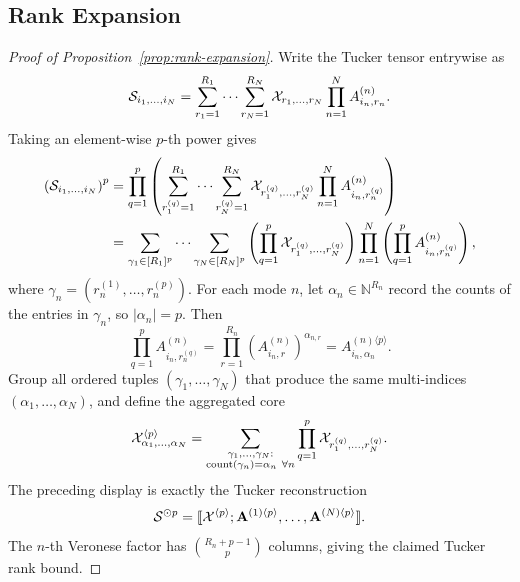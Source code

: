 \subsection{Rank Expansion}

\begin{proof}[Proof of Proposition~\ref{prop:rank-expansion}]
Write the Tucker tensor entrywise as
\begin{equation}
  \mathcal{S}_{i_1,\ldots,i_N}
  =
  \sum_{r_1=1}^{R_1}\cdots\sum_{r_N=1}^{R_N}
  \mathcal{X}_{r_1,\ldots,r_N}
  \prod_{n=1}^{N} A^{(n)}_{i_n,r_n}.
\end{equation}
Taking an element-wise \(p\)-th power gives
\begin{align}
  \left(\mathcal{S}_{i_1,\ldots,i_N}\right)^p
  &=
  \prod_{q=1}^{p}
  \left(
  \sum_{r_1^{(q)}=1}^{R_1}\cdots
  \sum_{r_N^{(q)}=1}^{R_N}
  \mathcal{X}_{r_1^{(q)},\ldots,r_N^{(q)}}
  \prod_{n=1}^{N} A^{(n)}_{i_n,r_n^{(q)}}
  \right) \\
  &=
  \sum_{\gamma_1\in[R_1]^p}\cdots
  \sum_{\gamma_N\in[R_N]^p}
  \left(
  \prod_{q=1}^{p}
  \mathcal{X}_{r_1^{(q)},\ldots,r_N^{(q)}}
  \right)
  \prod_{n=1}^{N}
  \left(
  \prod_{q=1}^{p} A^{(n)}_{i_n,r_n^{(q)}}
  \right),
\end{align}
where \(\gamma_n=(r_n^{(1)},\ldots,r_n^{(p)})\). For each mode \(n\), let
\(\alpha_n\in\mathbb N^{R_n}\) record the counts of the entries in
\(\gamma_n\), so \(|\alpha_n|=p\). Then
\begin{equation}
  \prod_{q=1}^{p} A^{(n)}_{i_n,r_n^{(q)}}
  =
  \prod_{r=1}^{R_n}\left(A^{(n)}_{i_n,r}\right)^{\alpha_{n,r}}
  =
  A^{(n)\langle p\rangle}_{i_n,\alpha_n}.
\end{equation}
Group all ordered tuples \((\gamma_1,\ldots,\gamma_N)\) that produce the same
multi-indices \((\alpha_1,\ldots,\alpha_N)\), and define the aggregated core
\begin{equation}
  \mathcal{X}^{\langle p\rangle}_{\alpha_1,\ldots,\alpha_N}
  =
  \sum_{\substack{\gamma_1,\ldots,\gamma_N:\\
  \operatorname{count}(\gamma_n)=\alpha_n\ \forall n}}
  \prod_{q=1}^{p}
  \mathcal{X}_{r_1^{(q)},\ldots,r_N^{(q)}}.
\end{equation}
The preceding display is exactly the Tucker reconstruction
\begin{equation}
  \mathcal{S}^{\odot p}
  =
  \llbracket \mathcal{X}^{\langle p\rangle}; \mathbf{A}^{(1)\langle p\rangle},\ldots,\mathbf{A}^{(N)\langle p\rangle} \rrbracket.
\end{equation}
The \(n\)-th Veronese factor has \(\binom{R_n+p-1}{p}\) columns, giving the
claimed Tucker rank bound.
\end{proof}

